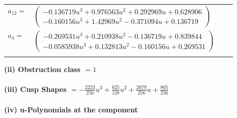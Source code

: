 \documentclass[1p]{elsarticle_modified}
\theoremstyle{definition}
\begin{document}
\begin{tabular}{m{7pt} m{180pt} m{7pt} m{180pt} }
\flushright $a_{12}=$&$\begin{pmatrix}-0.136719 u^{3}+0.976563 u^{2}+0.292969 u+0.628906\\-0.160156 u^{3}+1.42969 u^{2}-0.371094 u+0.136719\end{pmatrix}$ \\
\flushright $a_{4}=$&$\begin{pmatrix}-0.269531 u^{3}+0.210938 u^{2}-0.136719 u+0.839844\\-0.0585938 u^{3}+0.132813 u^{2}-0.160156 u+0.269531\end{pmatrix}$\\&\end{tabular}
\flushleft \textbf{(ii) Obstruction class $= 1$}\\~\\
\flushleft \textbf{(iii) Cusp Shapes $= -\frac{2223}{256} u^3+\frac{625}{128} u^2+\frac{2679}{256} u+\frac{805}{256}$}\\~\\
\newpage\renewcommand{\arraystretch}{1}
\flushleft \textbf{(iv) u-Polynomials at the component}\newline \\
\end{document}
